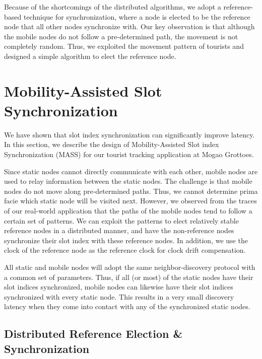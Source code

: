 \documentclass[twoside,twocolumn]{article}
\begin{document}
Because of the shortcomings of the distributed algorithms, we adopt a
reference-based technique for synchronization, where a node is elected
to be the reference node that all other nodes synchronize with.  Our
key observation is that although the mobile nodes do not follow a
pre-determined path, the movement is not completely random.  Thus, we
exploited the movement pattern of tourists and designed a simple
algorithm to elect the reference node.

\section{Mobility-Assisted Slot Synchronization}
\label{sec:mass}

We have shown that slot index synchronization can significantly
improve latency. In this section, we describe the design of
Mobility-Assisted Slot index Synchronization (MASS) for our tourist
tracking application at Mogao Grottoes.

Since static nodes cannot directly communicate with each other, mobile
nodes are used to relay information between the static nodes.  The
challenge is that mobile nodes do not move along pre-determined
paths. Thus, we cannot determine prima facie which static node will be
visited next.  However, we observed from the traces of our real-world
application that the paths of the mobile nodes tend to follow a
certain set of patterns. We can exploit the patterns to elect
relatively stable reference nodes in a distributed manner, and have
the non-reference nodes synchronize their slot index with these
reference nodes. In addition, we use the clock of the reference node
as the reference clock for clock drift compensation.

All static and mobile nodes will adopt the same neighbor-discovery
protocol with a common set of parameters. Thus, if all (or most) of
the static nodes have their slot indices synchronized, mobile nodes
can likewise have their slot indices synchronized with every static
node. This results in a very small discovery latency when they come
into contact with any of the synchronized static nodes.

\subsection{Distributed Reference Election \& Synchronization}
\label{sec:selection}
\end{document}

